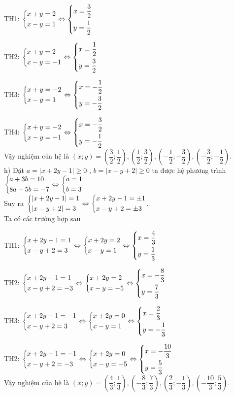 \begin{ex}
{TH1: $\heva{& x+y=2\\ & x-y=1}\Leftrightarrow \heva{& x=\dfrac{3}{2}\\ & y= \dfrac{1}{2}}$

TH2: $\heva{& x+y=2\\ & x-y=-1}\Leftrightarrow \heva{& x=\dfrac{1}{2}\\ & y= \dfrac{3}{2}}$

TH3: $\heva{& x+y=-2\\ & x-y=1}\Leftrightarrow \heva{& x=-\dfrac{1}{2}\\ & y=- \dfrac{3}{2}}$

TH4: $\heva{& x+y=-2\\ & x-y=-1}\Leftrightarrow \heva{& x=-\dfrac{3}{2}\\ & y=- \dfrac{1}{2}}$\\
Vậy nghiệm của  hệ là $(x;y) = \left(\dfrac{3}{2};\dfrac{1}{2} \right), \left(\dfrac{1}{2};\dfrac{3}{2} \right), \left(-\dfrac{1}{2};-\dfrac{3}{2} \right), \left(-\dfrac{3}{2};-\dfrac{1}{2} \right)$.\\ 
h) Đặt $a=|x+2y-1|\ge 0$ , $b=|x-y+2| \ge 0$    ta được hệ phương trình
$
\heva{& a+3b=10\\ & 8a-5b=-7}\Leftrightarrow \heva{& a=1\\ & b=3}$\\
Suy ra $\heva{& | x+2y-1| =1\\ & |x-y+2| =3} \Leftrightarrow \heva{& x+2y-1= \pm 1\\ & x-y+2=\pm 3}$.\\
Ta có  các trường hợp sau

TH1: $\heva{& x+2y-1=1\\ & x-y+2=3}\Leftrightarrow \heva{& x+2y=2\\ & x-y=1}\Leftrightarrow \heva{& x=\dfrac{4}{3}\\ & y= \dfrac{1}{3}}$

TH2: $\heva{& x+2y-1=1\\ & x-y+2=-3}\Leftrightarrow \heva{& x+2y=2\\& x-y=-5}\Leftrightarrow \heva{& x=-\dfrac{8}{3}\\ & y= \dfrac{7}{3}}$

TH3: $\heva{& x+2y-1=-1\\ & x-y+2=3}\Leftrightarrow \heva{& x+2y=0\\ & x-y=1}\Leftrightarrow \heva{& x=\dfrac{2}{3}\\ & y= -\dfrac{1}{3}}$

TH2: $\heva{& x+2y-1=-1\\ & x-y+2=-3}\Leftrightarrow \heva{& x+2y=0\\& x-y=-5}\Leftrightarrow \heva{& x=-\dfrac{10}{3}\\ & y= \dfrac{5}{3}}$\\
Vậy nghiệm của  hệ là $(x;y) = \left(\dfrac{4}{3};\dfrac{1}{3} \right), \left(-\dfrac{8}{3};\dfrac{7}{3} \right), \left(\dfrac{2}{3};-\dfrac{1}{3} \right), \left(-\dfrac{10}{3};\dfrac{5}{3} \right)$.\\ 



    }
\end{ex}

